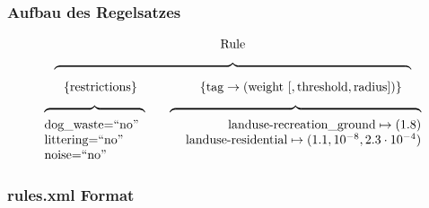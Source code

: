\begin{frame}[fragile]
 \frametitle{Aufbau des Regelsatzes}
 \[
  \begin{array}{c}
  \text{Rule} \\[6pt]
  \overbrace{\hspace{284pt}}\\[4pt]
    \{ \text{restrictions} \}
    \hspace{50pt}
    \{ \text{tag} \to (\text{weight}~[,\text{threshold},\text{radius}]) \} \\[6pt]
    \begin{array}{l r}
      \overbrace{ \hspace{80pt} } \hspace{10pt} & \overbrace{ \hspace{200pt} }\\
      \text{dog\_waste=``no''} & \text{landuse-recreation\_ground} \mapsto (1.8) \\
      \text{littering=``no''} & \text{landuse-residential} \mapsto (1.1,10^{-8},2.3\cdot 10^{-4}) \\
      \text{noise=``no''} &
    \end{array}
  \end{array}
 \]
\end{frame}

\begin{frame}[fragile]
  \frametitle{rules.xml Format}
  \lstset{language=XML,basicstyle=\scriptsize}
  
\end{frame}
